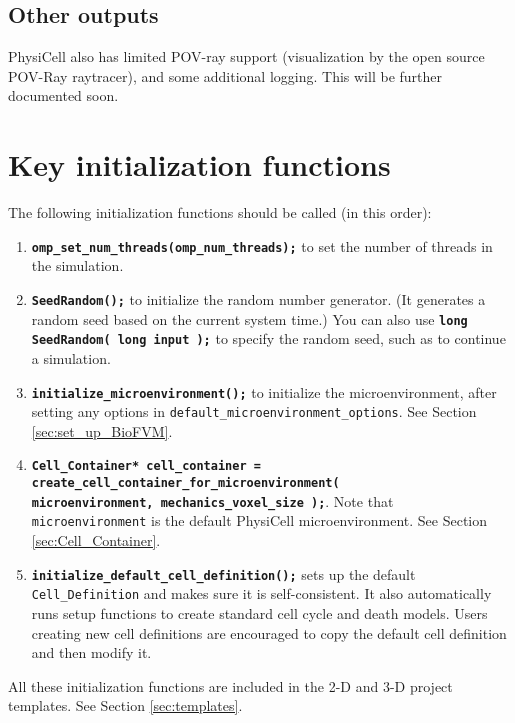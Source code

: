 \documentclass[12pt]{article}
\renewcommand{\v}{\verb}
\newcommand{\smallcode}[1]{\textbf{\texttt{#1}}}
\newcommand{\blue}[1]{\textcolor{blue}{#1}}
\newcommand{\DONE}{}%
\begin{document}
\subsection{Other outputs \DONE}
PhysiCell also has limited POV-ray support (visualization by 
the open source POV-Ray raytracer), and some additional logging. 
This will be further documented soon. 

\section{Key initialization functions \DONE}
\label{sec:Initialization_Functions}
The following initialization functions should be called (in this order): 

\begin{enumerate}
\item
\smallcode{omp\_set\_num\_threads(omp\_num\_threads);} to set the number of threads in the 
simulation. 

\item 
\smallcode{SeedRandom();} to initialize the random number generator. (It generates a 
random seed based on the current system time.)  You can also use 
\smallcode{long SeedRandom( long input );} to specify the random seed, such as to 
continue a simulation. 

\item 
\smallcode{initialize\_microenvironment();} to initialize the microenvironment, after setting 
any options in \v|default_microenvironment_options|. See Section \ref{sec:set_up_BioFVM}. 

\item 
\smallcode{Cell\_Container* cell\_container = \\
\phantom{Cell\_Container* }create\_cell\_container\_for\_microenvironment( \\
\phantom{Cell\_Container* }microenvironment, mechanics\_voxel\_size );}. Note 
that \v|microenvironment| is the default PhysiCell microenvironment. 
See Section \ref{sec:Cell_Container}. 

\item 
\smallcode{initialize\_default\_cell\_definition();} sets up the default 
\v|Cell_Definition| and makes sure it is self-consistent. It also 
automatically runs setup functions to create standard cell cycle and death 
models. Users creating 
new cell definitions are encouraged to copy the default cell definition 
and then modify it. 

\end{enumerate}
All these initialization functions are included in the 2-D and 
3-D project templates. See Section \ref{sec:templates}. 
\end{document}
